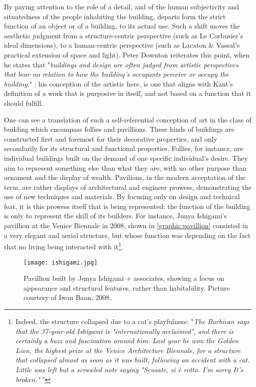 By paying attention to the role of a detail, and of the human subjectivity and situatedness of the people inhabiting the building, departs form the strict function of an object or of a building, to its actual use. Such a shift moves the aesthetic judgment from a structure-centric perspective (such as Le Corbusier's ideal dimensions), to a human-centric perspective (such as Lacaton \& Vassal's practical extension of space and light). Peter Downton reiterates this point, when he states that "\emph{buildings and design are often judged from artistic perspectives that bear no relation to how the building’s occupants perceive or occupy the building.}" \citep{downton_knowledge_1998}; his conception of the artistic here, is one that aligns with Kant's definition of a work that is purposive in itself, and not based on a function that it should fulfill.

One can see a translation of such a self-referential conception of art in the class of building which encompass follies and pavillions. These kinds of buildings are constructed first and foremost for their decorative properties, and only secondarily for its structural and functional properties. Follies, for instance, are individual buildings built on the demand of one specific individual's desire. They aim to represent something else than what they are, with no other purpose than ornament and the display of wealth. Pavilions, in the modern acceptation of the term, are rather displays of architectural and engineer prowess, demonstrating the use of new techniques and materials. By focusing only on design and technical feat, it is this prowess itself that is being represented: the function of the building is only to represent the skill of its builders. For instance, Junya Ishigami's pavillion at the Venice Biennale in 2008, shown in \autoref{graphic:pavillion} consisted in a very elegant and aerial structure, but whose function was depending on the fact that no living being interacted with it\footnote{Indeed, the structure collapsed due to a cat's playfulness: "\emph{The Barbican says that the 37-year-old Ishigami is "internationally acclaimed", and there is certainly a buzz and fascination around him. Last year he won the Golden Lion, the highest prize at the Venice Architecture Biennale, for a structure that collapsed almost as soon as it was built, following an accident with a cat. Little was left but a scrawled note saying "Scusate, si è rotto. I'm sorry It's broken." } \citep{moore_junya_2011}"}.

\begin{figure}
    \texttt{[image: ishigami.jpg]}
    \caption{Pavillion built by Junya Ishigami + associates, showing a focus on appearance and structural features, rather than habitability. Picture courtesy of Iwan Baan, 2008.}
    \label{graphic:pavillion}
\end{figure}

